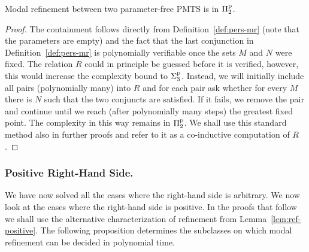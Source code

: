 \begin{proposition} \label{prop:coinduction}
Modal refinement between two parameter-free PMTS is in $\mathrm\Pi^\mathrm p_2$.
\end{proposition}
\begin{proof}
The containment follows directly from Definition~\ref{def:pers-mr} 
(note that the parameters are empty) and 
the fact that the last conjunction 
in Definition~\ref{def:pers-mr} is polynomially verifiable 
once the sets $M$ and $N$ were fixed.
The relation $R$ could in principle be guessed before
it is verified, however, this would increase the complexity bound
to $\mathrm\Sigma^\mathrm p_3$.  Instead, we will initially include all 
pairs (polynomially many) into $R$ and for each pair 
ask whether for every $M$ there is $N$ such that the two
conjuncts are satisfied. If it fails, we remove the pair and 
continue until we reach (after
polynomially many steps) the greatest fixed point. The complexity in
this way remains in $\mathrm\Pi^\mathrm p_2$. We shall use this standard method 
also in further proofs
and refer to it as a co-inductive computation of $R$.

\end{proof}

\subsubsection{Positive Right-Hand Side.}
We have now solved all the cases where the right-hand side is arbitrary.
We now look at the cases where the right-hand side is positive.
In the proofs that follow we shall use the alternative characterization
of refinement from Lemma~\ref{lem:ref-positive}.
The following proposition determines the subclasses on which modal refinement 
can be decided in polynomial time.

